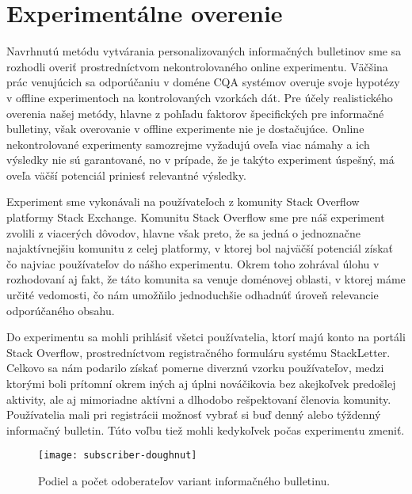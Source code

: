 \afterpage{\blankpage}
\newpage
\chapter{Experimentálne overenie}
\label{sec:experiment}

Navrhnutú metódu vytvárania personalizovaných informačných bulletinov sme sa rozhodli overiť prostredníctvom
nekontrolovaného online experimentu. Väčšina prác venujúcich sa odporúčaniu v doméne CQA systémov overuje
svoje hypotézy v offline experimentoch na kontrolovaných vzorkách dát. Pre účely realistického overenia našej metódy, hlavne
z pohľadu faktorov špecifických pre informačné bulletiny, však overovanie v offline experimente nie je dostačujúce.
Online nekontrolované experimenty samozrejme vyžadujú oveľa viac námahy a ich výsledky nie sú garantované, no v prípade,
že je takýto experiment úspešný, má oveľa väčší potenciál priniesť relevantné výsledky.

Experiment sme vykonávali na používateľoch z komunity Stack Overflow platformy Stack Exchange.
Komunitu Stack Overflow sme pre náš experiment zvolili z viacerých dôvodov, hlavne však preto,
že sa jedná o jednoznačne najaktívnejšiu komunitu z celej platformy, v ktorej bol najväčší potenciál získať čo najviac
používateľov do nášho experimentu. Okrem toho zohrával úlohu v rozhodovaní aj fakt, že táto komunita sa venuje doménovej
oblasti, v ktorej máme určité vedomosti, čo nám umožňilo jednoduchšie odhadnúť úroveň relevancie odporúčaného obsahu.

Do experimentu sa mohli prihlásiť všetci používatelia, ktorí majú konto na portáli Stack Overflow, prostredníctvom
registračného formuláru systému StackLetter. Celkovo sa nám podarilo získať pomerne diverznú vzorku používateľov,
medzi ktorými boli prítomní okrem iných aj úplni nováčikovia bez akejkoľvek predošlej aktivity, ale aj mimoriadne aktívni
a dlhodobo rešpektovaní členovia komunity. Používatelia mali pri registrácii možnosť vybrať si buď denný alebo týždenný
informačný bulletin. Túto voľbu tiež mohli kedykoľvek počas experimentu zmeniť.

\begin{figure}[H]\begin{center}
\texttt{[image: subscriber-doughnut]}
\caption{Podiel a počet odoberateľov variant informačného bulletinu.\label{fig:subscriber-chart}}\end{center}
\end{figure}

